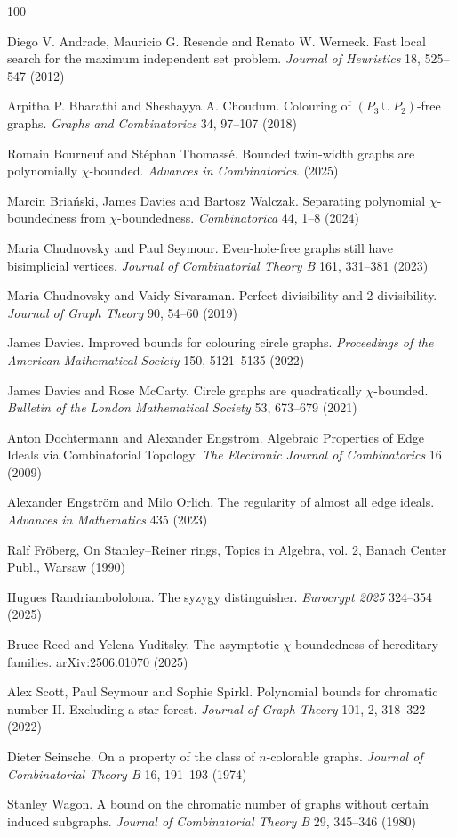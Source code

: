 \documentclass{article}
\theoremstyle{plain}
\theoremstyle{definition}
\begin{document}
\begin{thebibliography}{100} 

Diego V. Andrade, Mauricio G. Resende and Renato W.  Werneck. Fast local search for the maximum independent set problem. \emph{Journal of Heuristics} 18, 525--547 (2012)

Arpitha P. Bharathi and Sheshayya A. Choudum. Colouring of $(P_3 \cup P_2)$-free graphs. \emph{Graphs and Combinatorics} 34, 97--107 (2018)

Romain Bourneuf and St\'ephan Thomass\'e. Bounded twin-width graphs are polynomially $\chi$-bounded. \emph{Advances in Combinatorics}. (2025)

Marcin Briański, James Davies and Bartosz Walczak. Separating polynomial $\chi$-boundedness from $\chi$-boundedness. \emph{Combinatorica} 44, 1--8 (2024)

 Maria Chudnovsky and Paul Seymour. Even-hole-free graphs still have bisimplicial vertices. \emph{Journal of Combinatorial Theory B} 161, 331--381 (2023)

Maria Chudnovsky and Vaidy Sivaraman. Perfect divisibility and 2-divisibility. \emph{Journal of Graph Theory} 90, 54--60 (2019)

James Davies. Improved bounds for colouring circle graphs. \emph{Proceedings of the American Mathematical Society} 150, 5121–5135 (2022)
 
James Davies and Rose McCarty. Circle graphs are quadratically $\chi$-bounded. \emph{Bulletin of the London Mathematical Society} 53, 673--679 (2021)
 
Anton Dochtermann and Alexander Engström. Algebraic Properties of Edge Ideals via Combinatorial Topology. \emph{The Electronic Journal of Combinatorics} 16 (2009)

Alexander Engström and Milo Orlich. The regularity of almost all edge ideals. \emph{Advances in Mathematics} 435 (2023)

Ralf Fr\"oberg, On Stanley–Reiner rings, Topics in Algebra, vol. 2, Banach Center Publ., Warsaw (1990)

Hugues Randriambololona. The syzygy distinguisher. \emph{Eurocrypt 2025} 324--354 (2025)

Bruce Reed and Yelena Yuditsky. The asymptotic $\chi$-boundedness of hereditary families. arXiv:2506.01070 (2025)

Alex Scott, Paul Seymour and Sophie Spirkl. Polynomial bounds for chromatic number II. Excluding a star-forest. \emph{Journal of Graph Theory}  101, 2, 318--322 (2022)

Dieter Seinsche. On a property of the class of $n$-colorable graphs. \emph{Journal of Combinatorial Theory B} 16, 191--193 (1974)

Stanley Wagon. A bound on the chromatic number of graphs without certain induced subgraphs. \emph{Journal of Combinatorial Theory B} 29, 345--346 (1980)

\end{thebibliography}
\end{document}
